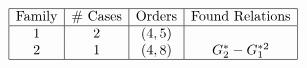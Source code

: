 \begin{table}[h]
	\centering
	$\begin{array}{|c|c|c|c|}
		\hline
		\text{Family} & \text{\# Cases} & \text{Orders} & \text{Found Relations} \\
		\hline
		1 & 2 & (4, 5) &  \\
		2 & 1 & (4, 8) & G_2^* - G_1^{ *2} \\
		\hline
	\end{array}$
\end{table}
